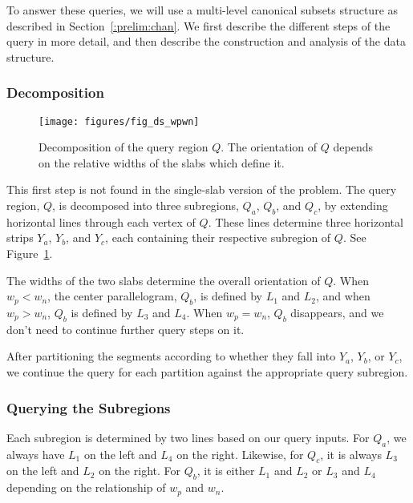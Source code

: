 To answer these queries, we will use a multi-level canonical subsets structure as described in Section~\ref{:prelim:chan}. We first describe the different steps of the query in more detail, and then describe the construction and analysis of the data structure.


\subsubsection{Decomposition}

\begin{figure}[t]
\begin{center}
  \texttt{[image: figures/fig\_ds\_wpwn]}
  \caption[Decomposition of the query region $Q$.]{Decomposition of the query region $Q$. The orientation of $Q$ depends on the relative widths of the slabs which define it.}
  \label{fig:slabs:two:wpwn}
\end{center}
\end{figure}

This first step is not found in the single-slab version of the problem. 
The query region, $Q$, is decomposed into three subregions, $Q_a$, $Q_b$, and $Q_c$, by extending horizontal lines through each vertex of $Q$.
These lines determine three horizontal strips $Y_a$, $Y_b$, and $Y_c$, each containing their respective subregion of $Q$. 
See Figure~\ref{fig:slabs:two:wpwn}.

The widths of the two slabs determine the overall orientation of $Q$. When $w_p < w_n$, the center parallelogram, $Q_b$, is defined by $L_1$ and $L_2$, and when $w_p > w_n$, $Q_b$ is defined by $L_3$ and $L_4$. When $w_p = w_n$, $Q_b$ disappears, and we don't need to continue further query steps on it.

After partitioning the segments according to whether they fall into $Y_a$, $Y_b$, or $Y_c$, we continue the query for each partition against the appropriate query subregion.


\subsubsection{Querying the Subregions}

Each subregion is determined by two lines based on our query inputs. For $Q_a$, we always have $L_1$ on the left and $L_4$ on the right. Likewise, for $Q_c$, it is always $L_3$ on the left and $L_2$ on the right. For $Q_b$, it is either $L_1$ and $L_2$ or $L_3$ and $L_4$ depending on the relationship of $w_p$ and $w_n$.

